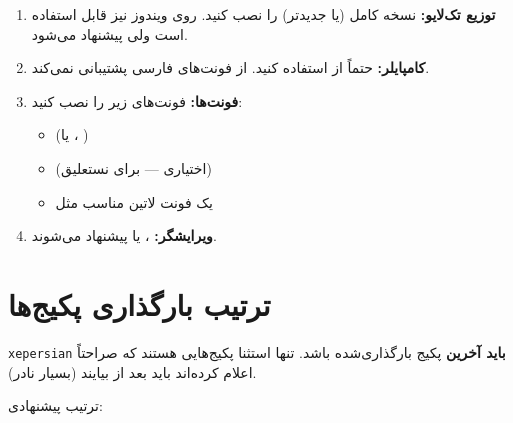 \documentclass[12pt,a4paper,twoside]{book}
\begin{document}
\begin{enumerate}[label=\textcolor{PrimaryBlue}{\arabic*.},itemsep=6pt]
  \item \textbf{توزیع تک‌لایو:}
    نسخه کامل  (یا جدیدتر) را نصب کنید.
    روی ویندوز  نیز قابل استفاده است ولی
     پیشنهاد می‌شود.

  \item \textbf{کامپایلر:}
    حتماً از  استفاده کنید.
     از فونت‌های فارسی پشتیبانی نمی‌کند.

  \item \textbf{فونت‌ها:}
    فونت‌های زیر را نصب کنید:
    \begin{itemize}
      \item {} (یا ، )
      \item {} (اختیاری — برای نستعلیق)
      \item یک فونت لاتین مناسب مثل 
    \end{itemize}

  \item \textbf{ویرایشگر:}
    ، 
    یا  پیشنهاد می‌شوند.
\end{enumerate}

\section{ترتیب بارگذاری پکیج‌ها}
\label{sec:pkg-order}

\begin{notebox}
  \texttt{xepersian} \textbf{باید آخرین} پکیج بارگذاری‌شده باشد.
  تنها استثنا پکیج‌هایی هستند که صراحتاً اعلام کرده‌اند
  باید بعد از  بیایند (بسیار نادر).
\end{notebox}

ترتیب پیشنهادی:
\end{document}
